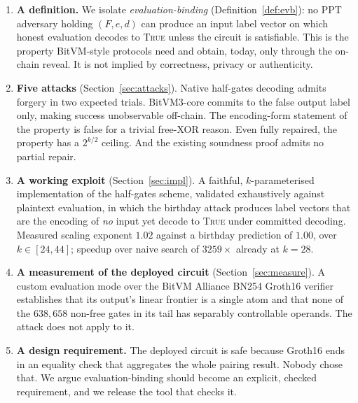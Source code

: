 \documentclass[11pt,a4paper]{article}
\theoremstyle{definition}
\theoremstyle{plain}
\begin{document}
\begin{enumerate}[leftmargin=*,itemsep=2pt]
  \item \textbf{A definition.} We isolate \emph{evaluation-binding}
    (Definition~\ref{def:evb}): no PPT adversary holding $(F, e, d)$ can produce
    an input label vector on which honest evaluation decodes to \textsc{True}
    unless the circuit is satisfiable. This is the property BitVM-style
    protocols need and obtain, today, only through the on-chain reveal. It is
    not implied by correctness, privacy or authenticity.

  \item \textbf{Five attacks} (Section~\ref{sec:attacks}). Native half-gates
    decoding admits forgery in two expected trials. BitVM3-core commits to the
    false output label only, making success unobservable off-chain. The
    encoding-form statement of the property is false for a trivial free-XOR
    reason. Even fully repaired, the property has a $2^{k/2}$ ceiling. And the
    existing soundness proof admits no partial repair.

  \item \textbf{A working exploit} (Section~\ref{sec:impl}). A faithful,
    $k$-parameterised implementation of the half-gates scheme, validated
    exhaustively against plaintext evaluation, in which the birthday attack
    produces label vectors that are the encoding of \emph{no} input yet decode
    to \textsc{True} under committed decoding. Measured scaling exponent $1.02$
    against a birthday prediction of $1.00$, over $k \in [24,44]$; speedup over
    naive search of $3259\times$ already at $k=28$.

  \item \textbf{A measurement of the deployed circuit}
    (Section~\ref{sec:measure}). A custom evaluation mode over the BitVM
    Alliance BN254 Groth16 verifier~\cite{GSV} establishes that its output's
    linear frontier is a single atom and that none of the $638{,}658$ non-free
    gates in its tail has separably controllable operands. The attack does not
    apply to it.

  \item \textbf{A design requirement.} The deployed circuit is safe because
    Groth16 ends in an equality check that aggregates the whole pairing result.
    Nobody chose that. We argue evaluation-binding should become an explicit,
    checked requirement, and we release the tool that checks it.
\end{enumerate}
\end{document}
